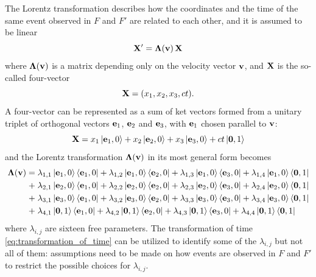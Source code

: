 \documentclass[12pt]{article}
\begin{document}
The Lorentz transformation describes how the coordinates and the time of the same event
observed in $F$ and $F'$ are related to each other, and it is assumed to be linear
\begin{equation}
  \vb{X}' = \boldsymbol{\Lambda}(\vb{v})\,\vb{X}
\end{equation}
where $\boldsymbol{\Lambda}(\vb{v})$ is a matrix depending only on the velocity vector
$\vb{v}$, and $\vb{X}$ is the so-called four-vector
\begin{equation}
  \vb{X} = (x_1, x_2, x_3, ct).
\end{equation}
A four-vector can be represented as a sum of ket vectors formed from a unitary triplet of
orthogonal vectors $\vb{e}_1$, $\vb{e}_2$ and $\vb{e}_3$, with $\vb{e}_1$ chosen parallel to
$\vb{v}$:
\begin{equation}
  \vb{X} = x_1\ket{\vb{e}_1, 0} + x_2\ket{\vb{e}_2, 0} + x_3\ket{\vb{e}_3, 0}
           + ct\ket{\vb{0}, 1}
\end{equation}
and the Lorentz transformation $\boldsymbol{\Lambda}(\vb{v})$ in its most general form
becomes
\begin{equation}
  \begin{aligned}
    \boldsymbol{\Lambda}(\vb{v}) =\;
      &\lambda_{1,1}\ket{\vb{e}_1,0}\bra{\vb{e}_1,0}
      + \lambda_{1,2}\ket{\vb{e}_1,0}\bra{\vb{e}_2,0}
      + \lambda_{1,3}\ket{\vb{e}_1,0}\bra{\vb{e}_3,0}
      + \lambda_{1,4}\ket{\vb{e}_1,0}\bra{\vb{0},1} \\
    +\;&\lambda_{2,1}\ket{\vb{e}_2,0}\bra{\vb{e}_1,0}
      + \lambda_{2,2}\ket{\vb{e}_2,0}\bra{\vb{e}_2,0}
      + \lambda_{2,3}\ket{\vb{e}_2,0}\bra{\vb{e}_3,0}
      + \lambda_{2,4}\ket{\vb{e}_2,0}\bra{\vb{0},1} \\
    +\;&\lambda_{3,1}\ket{\vb{e}_3,0}\bra{\vb{e}_1,0}
      + \lambda_{3,2}\ket{\vb{e}_3,0}\bra{\vb{e}_2,0}
      + \lambda_{3,3}\ket{\vb{e}_3,0}\bra{\vb{e}_3,0}
      + \lambda_{3,4}\ket{\vb{e}_3,0}\bra{\vb{0},1} \\
    +\;&\lambda_{4,1}\ket{\vb{0},1}\bra{\vb{e}_1,0}
      + \lambda_{4,2}\ket{\vb{0},1}\bra{\vb{e}_2,0}
      + \lambda_{4,3}\ket{\vb{0},1}\bra{\vb{e}_3,0}
      + \lambda_{4,4}\ket{\vb{0},1}\bra{\vb{0},1}
  \end{aligned}
  \label{eq:general_Lorentz}
\end{equation}
where $\lambda_{i,j}$ are sixteen free parameters. The transformation of time
\eqref{eq:transformation_of_time} can be utilized to identify some of the $\lambda_{i,j}$ but
not all of them: assumptions need to be made on how events are observed in $F$ and $F'$ to
restrict the possible choices for $\lambda_{i,j}$.
\end{document}
